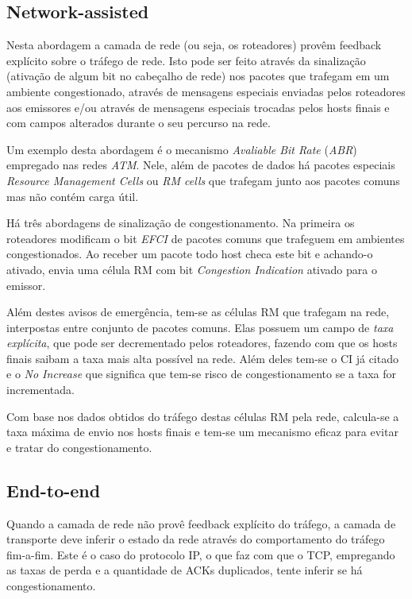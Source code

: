 \subsection{Network-assisted}

Nesta abordagem a camada de rede (ou seja, os roteadores) provêm feedback explícito sobre o tráfego de rede.
Isto pode ser feito através da sinalização (ativação de algum bit no cabeçalho de rede) nos pacotes que trafegam em um ambiente congestionado, 
através de mensagens especiais enviadas pelos roteadores aos emissores e/ou 
através de mensagens especiais trocadas pelos hosts finais e com campos alterados durante o seu percurso na rede.

Um exemplo desta abordagem é o mecanismo \emph{Avaliable Bit Rate} (\emph{ABR}) empregado nas redes \emph{ATM}.
Nele, além de pacotes de dados há pacotes especiais \emph{Resource Management Cells} ou \emph{RM cells} que trafegam junto aos pacotes comuns mas não contém carga útil.

Há três abordagens de sinalização de congestionamento.
Na primeira os roteadores modificam o bit \emph{EFCI} de pacotes comuns que trafeguem em ambientes congestionados.
Ao receber um pacote todo host checa este bit e achando-o ativado, envia uma célula RM com bit \emph{Congestion Indication} ativado para o emissor.

Além destes avisos de emergência, tem-se as células RM que trafegam na rede, interpostas entre conjunto de pacotes comuns.
Elas possuem um campo de \emph{taxa explícita}, que pode ser decrementado pelos roteadores, fazendo com que os hosts finais saibam a taxa mais alta possível na rede.
Além deles tem-se o CI já citado e o \emph{No Increase} que significa que tem-se risco de congestionamento se a taxa for incrementada.

Com base nos dados obtidos do tráfego destas células RM pela rede, calcula-se a taxa máxima de envio nos hosts finais e tem-se um mecanismo eficaz para evitar e tratar do congestionamento.

\subsection{End-to-end}

Quando a camada de rede não provê feedback explícito do tráfego, a camada de transporte deve inferir o estado da rede através do comportamento do tráfego fim-a-fim.
Este é o caso do protocolo IP, o que faz com que o TCP, empregando as taxas de perda e a quantidade de ACKs duplicados, tente inferir se há congestionamento.

